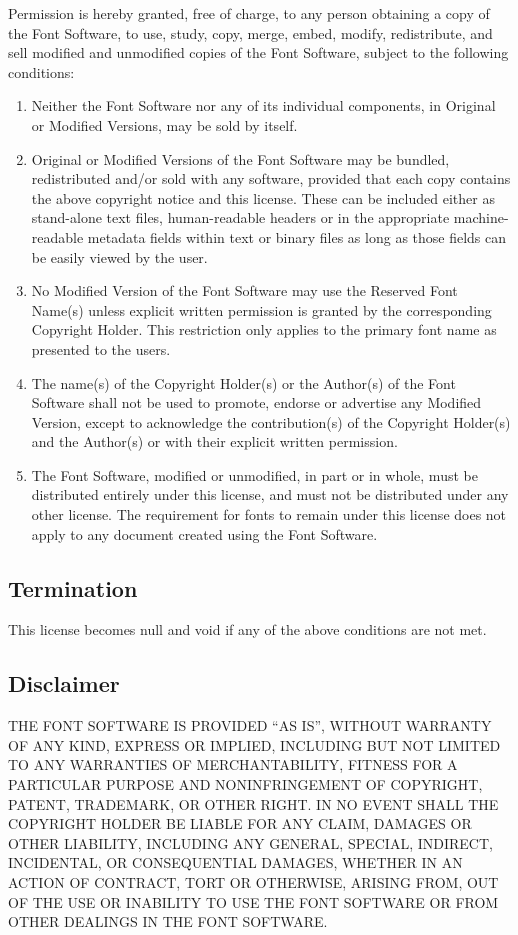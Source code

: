 \documentclass[paper=a4, 10pt]{scrbook}
\begin{document}
Permission is hereby granted, free of charge, to any person obtaining a copy of the Font Software, to use, study, copy, merge, embed, modify, redistribute, and sell modified and unmodified copies of the Font Software, subject to the following conditions:

\begin{enumerate}
	\item Neither the Font Software nor any of its individual components, in Original or Modified Versions, may be sold by itself.
	\item Original or Modified Versions of the Font Software may be bundled, redistributed and/or sold with any software, provided that each copy contains the above copyright notice and this license. These can be included either as stand-alone text files, human-readable headers or in the appropriate machine-readable metadata fields within text or binary files as long as those fields can be easily viewed by the user.
	\item No Modified Version of the Font Software may use the Reserved Font Name(s) unless explicit written permission is granted by the corresponding Copyright Holder. This restriction only applies to the primary font name as presented to the users.

	\item The name(s) of the Copyright Holder(s) or the Author(s) of the Font Software shall not be used to promote, endorse or advertise any Modified Version, except to acknowledge the contribution(s) of the Copyright Holder(s) and the Author(s) or with their explicit written permission.

	\item The Font Software, modified or unmodified, in part or in whole, must be distributed entirely under this license, and must not be
distributed under any other license. The requirement for fonts to remain under this license does not apply to any document created using the Font Software.

\end{enumerate}

\subsection{Termination}

This license becomes null and void if any of the above conditions are not met.

\subsection{Disclaimer}

 THE FONT SOFTWARE IS PROVIDED “AS IS”, WITHOUT WARRANTY OF ANY KIND, EXPRESS OR IMPLIED, INCLUDING BUT NOT LIMITED TO ANY WARRANTIES OF MERCHANTABILITY, FITNESS FOR A PARTICULAR PURPOSE AND NONINFRINGEMENT OF COPYRIGHT, PATENT, TRADEMARK, OR OTHER RIGHT. IN NO EVENT SHALL THE COPYRIGHT HOLDER BE LIABLE FOR ANY CLAIM, DAMAGES OR OTHER LIABILITY, INCLUDING ANY GENERAL, SPECIAL, INDIRECT, INCIDENTAL, OR CONSEQUENTIAL DAMAGES, WHETHER IN AN ACTION OF CONTRACT, TORT OR OTHERWISE, ARISING FROM, OUT OF THE USE OR INABILITY TO USE THE FONT SOFTWARE OR FROM OTHER DEALINGS IN THE FONT SOFTWARE.
\end{document}
